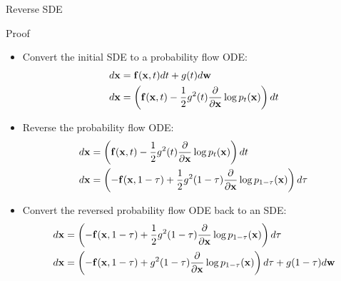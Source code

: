 \documentclass{beamer}
\renewcommand{\eqpause}{}
\begin{document}
\begin{frame}{Reverse SDE}
	\begin{block}{Proof}
		\begin{itemize}
			\item Convert the initial SDE to a probability flow ODE:
			\vspace{-0.1cm}
			{\footnotesize
			\begin{align*}
				d\mathbf{x} &= \mathbf{f}(\mathbf{x}, t) dt + g(t) d \mathbf{w} \\
				d\mathbf{x} &= \left(\mathbf{f}(\mathbf{x}, t) -\frac{1}{2} g^2(t) \frac{\partial}{\partial \mathbf{x}} \log p_t(\mathbf{x}) \right) dt
			\end{align*}
			}
			\vspace{-0.5cm}
			\eqpause
			\item Reverse the probability flow ODE:
			\vspace{-0.1cm}
			{\footnotesize
			\begin{align*}
				d\mathbf{x} &= \left(\mathbf{f}(\mathbf{x}, t) -\frac{1}{2} g^2(t) \frac{\partial}{\partial \mathbf{x}} \log p_t(\mathbf{x}) \right) dt \\
				d\mathbf{x} &= \left(-\mathbf{f}(\mathbf{x}, 1 - \tau) + \frac{1}{2} g^2(1 - \tau) \frac{\partial}{\partial \mathbf{x}} \log p_{1 - \tau}(\mathbf{x}) \right) d\tau
			\end{align*}
			}
			\vspace{-0.5cm}
			\eqpause
			\item Convert the reversed probability flow ODE back to an SDE:
			\vspace{-0.1cm}
			{\footnotesize
			\begin{align*}
				d\mathbf{x} &= \left(-\mathbf{f}(\mathbf{x}, 1 - \tau) + \frac{1}{2} g^2(1 - \tau) \frac{\partial}{\partial \mathbf{x}} \log p_{1 - \tau}(\mathbf{x}) \right) d \tau \\
				d\mathbf{x} &= \left(-\mathbf{f}(\mathbf{x}, 1 - \tau) + g^2(1 - \tau) \frac{\partial}{\partial \mathbf{x}} \log p_{1 - \tau}(\mathbf{x}) \right) d \tau + g(1-\tau)d\mathbf{w}
			\end{align*}
			}
		\end{itemize}
	\end{block}
\end{frame}
\end{document}
